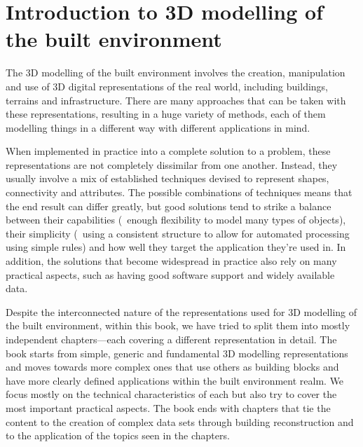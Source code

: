 
\setchapterpreamble[u]{\margintoc}

\graphicspath{{intro/}}

\chapter{Introduction to 3D modelling of the built environment}%
\label{chap:intro}



The 3D modelling of the built environment involves the creation, manipulation and use of 3D digital representations of the real world, including buildings, terrains and infrastructure.
There are many approaches that can be taken with these representations, resulting in a huge variety of methods, each of them modelling things in a different way with different applications in mind.


When implemented in practice into a complete solution to a problem, these representations are not completely dissimilar from one another.
Instead, they usually involve a mix of established techniques devised to represent shapes, connectivity and attributes.
The possible combinations of techniques means that the end result can differ greatly, but good solutions tend to strike a balance between their capabilities (\eg\ enough flexibility to model many types of objects), their simplicity (\eg\ using a consistent structure to allow for automated processing using simple rules) and how well they target the application they're used in.
In addition, the solutions that become widespread in practice also rely on many practical aspects, such as having good software support and widely available data.


Despite the interconnected nature of the representations used for 3D modelling of the built environment, within this book, we have tried to split them into mostly independent chapters---each covering a different representation in detail.
The book starts from simple, generic and fundamental 3D modelling representations and moves towards more complex ones that use others as building blocks and have more clearly defined applications within the built environment realm.
We focus mostly on the technical characteristics of each but also try to cover the most important practical aspects.
The book ends with chapters that tie the content to the creation of complex data sets through building reconstruction and to the application of the topics seen in the chapters.

